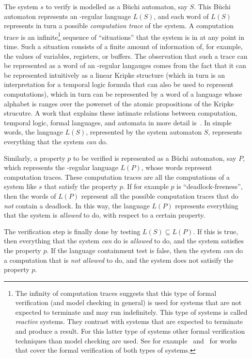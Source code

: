 The system $s$ to verify is modelled as a Büchi automaton, say $S$. This Büchi automaton represents an \om-regular language $L(S)$, and each word of $L(S)$ represents in turn a possible \textit{computation trace} of the system. A computation trace is an infinite\footnote{The infinity of computation traces suggests that this type of formal verification (and model checking in general) is used for systems that are not expected to terminate and  may run indefinitely. This type of systems is called \textit{reactive} systems. They contrast with systems that are expected to terminate and produce a result. For this latter type of systems other formal verification techniques than model checking are used. See for example~\cite{huth2004logic} and~\cite{ben2012mathematical} for works that cover the formal verification of both types of systems.} sequence of ``situations'' that the system is in at any point in time. Such a situation consists of a finite amount of information of, for example, the values of variables, registers, or buffers. The observation that such a trace can be represented as a word of an \om-regular langauges comes from the fact that it can be represented intuitively as a linear Kripke structure (which in turn is an interpretation for a temporal logic formula that can also be used to represent computations), which in turn can be represented by a word of a language whose alphabet is ranges over the powerset of the atomic propositions of the Kripke strucutre. A work that explains these intimate relations between computation, temporal logic, formal languages, and automata in more detail is~\cite{1996_vardi}. In simple words, the language $L(S)$, represented by the system automaton $S$, represents everything that the system \textit{can} do.

Similarly, a property $p$ to be verified is represented as a Büchi automaton, say $P$, which represents the \om-regular language $L(P)$, whose words represent computation traces. These computation traces are all the computations of a system like $s$ that satisfy the property $p$. If for example $p$ is ``deadlock-freeness'', then the words of $L(P)$ represent all the possible computation traces that do \textit{not} contain a deadlock. In this way, the language $L(P)$ represents everything that the system is \textit{allowed} to do, with respect to a certain property.

The verification step is finally done by testing $L(S) \subseteq L(P)$. If this is true, then everything that the system \textit{can} do is \textit{allowed} to do, and the system satisfies the property $p$. If the language containment test is false, then the system \textit{can} do a computation that is \textit{not allowed} to do, and the system does not satisify the property $p$.


